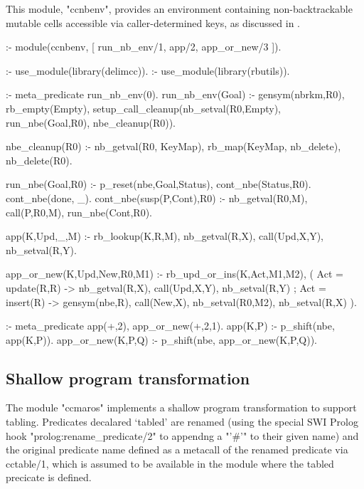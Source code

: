 This module, "ccnbenv", provides an environment containing non-backtrackable mutable
cells accessible via caller-determined keys, as discussed in .
\begin{prolog-framed}[name=ccnbenv]
  :- module(ccnbenv, [ run_nb_env/1, app/2, app_or_new/3 ]).

  :- use_module(library(delimcc)).
  :- use_module(library(rbutils)).

  :- meta_predicate run_nb_env(0).
  run_nb_env(Goal) :- 
     gensym(nbrkm,R0), rb_empty(Empty),
     setup_call_cleanup(nb_setval(R0,Empty), 
                        run_nbe(Goal,R0), 
                        nbe_cleanup(R0)).
                      
  nbe_cleanup(R0) :-
     nb_getval(R0, KeyMap),
     rb_map(KeyMap, nb_delete),
     nb_delete(R0).

  run_nbe(Goal,R0) :- p_reset(nbe,Goal,Status), cont_nbe(Status,R0).
  cont_nbe(done, _).
  cont_nbe(susp(P,Cont),R0) :- 
    nb_getval(R0,M), call(P,R0,M), run_nbe(Cont,R0).

  app(K,Upd,_,M) :- 
     rb_lookup(K,R,M),
     nb_getval(R,X), call(Upd,X,Y), nb_setval(R,Y).

  app_or_new(K,Upd,New,R0,M1) :- 
     rb_upd_or_ins(K,Act,M1,M2),
     (  Act = update(R,R) -> nb_getval(R,X), call(Upd,X,Y), nb_setval(R,Y)
     ;  Act = insert(R)    -> gensym(nbe,R),  call(New,X),
                              nb_setval(R0,M2), nb_setval(R,X)
     ).

  :- meta_predicate app(+,2), app_or_new(+,2,1).
  app(K,P) :- p_shift(nbe, app(K,P)).
  app_or_new(K,P,Q) :- p_shift(nbe, app_or_new(K,P,Q)).
\end{prolog-framed}

\subsection{Shallow program transformation}
\label{sec:ccmacros}

The module "ccmaros" implements a shallow program transformation to support
tabling. Predicates decalared `tabled' are renamed (using the special
SWI Prolog hook "prolog:rename_predicate/2" to appendng
a "'#'" to their given name) and the original predicate name defined
as a metacall of the renamed predicate via cctable/1, which is 
assumed to be available in the module where the tabled precicate
is defined. 

